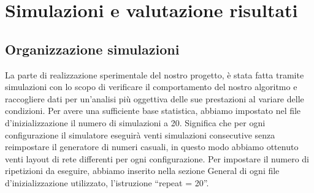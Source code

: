 \chapter{Simulazioni e valutazione risultati}
\label{chap:sim_val}

\section{Organizzazione simulazioni}
La parte di realizzazione sperimentale del nostro progetto, è stata fatta tramite simulazioni con lo scopo di verificare il comportamento del nostro algoritmo e raccogliere dati per un'analisi più oggettiva delle sue prestazioni al variare delle condizioni. Per avere una sufficiente base statistica, abbiamo impostato nel file d'inizializzazione il numero di simulazioni a 20. Significa che per ogni configurazione il simulatore eseguirà venti simulazioni consecutive senza reimpostare il generatore di numeri casuali, in questo modo abbiamo ottenuto venti layout di rete differenti per ogni configurazione. Per impostare il numero di ripetizioni da eseguire, abbiamo inserito nella sezione General di ogni file d'inizializzazione utilizzato, l'istruzione “repeat = 20”.

